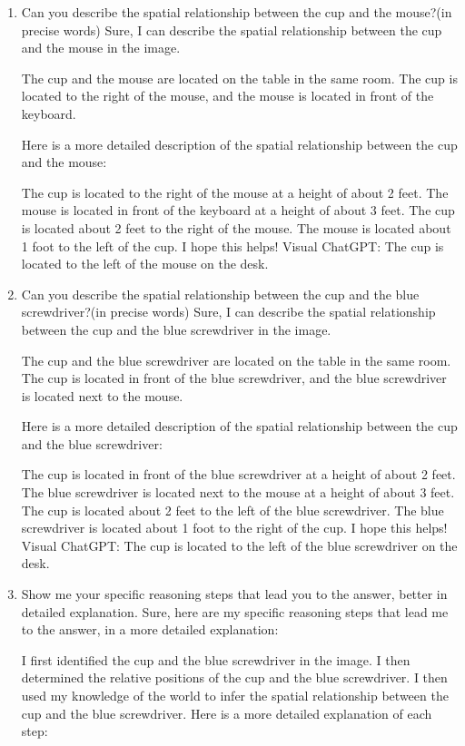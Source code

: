 \begin{enumerate}
    \item Can you describe the spatial relationship between the cup and the mouse?(in precise words)
    \subitem 
    Sure, I can describe the spatial relationship between the cup and the mouse in the image.
    
    The cup and the mouse are located on the table in the same room. The cup is located to the right of the mouse, and the mouse is located in front of the keyboard.
    
    Here is a more detailed description of the spatial relationship between the cup and the mouse:
    
    The cup is located to the right of the mouse at a height of about 2 feet.
    The mouse is located in front of the keyboard at a height of about 3 feet.
    The cup is located about 2 feet to the right of the mouse.
    The mouse is located about 1 foot to the left of the cup.
    I hope this helps!
    \subitem Visual ChatGPT: The cup is located to the left of the mouse on the desk.
    \item Can you describe the spatial relationship between the cup and the blue screwdriver?(in precise words)
    \subitem 
    Sure, I can describe the spatial relationship between the cup and the blue screwdriver in the image.
    
    The cup and the blue screwdriver are located on the table in the same room. The cup is located in front of the blue screwdriver, and the blue screwdriver is located next to the mouse.
    
    Here is a more detailed description of the spatial relationship between the cup and the blue screwdriver:
    
    The cup is located in front of the blue screwdriver at a height of about 2 feet.
    The blue screwdriver is located next to the mouse at a height of about 3 feet.
    The cup is located about 2 feet to the left of the blue screwdriver.
    The blue screwdriver is located about 1 foot to the right of the cup.
    I hope this helps!
    \subitem Visual ChatGPT: The cup is located to the left of the blue screwdriver on the desk.
    \item Show me your specific reasoning steps that lead you to the answer, better in detailed explanation.
    \subitem 
    Sure, here are my specific reasoning steps that lead me to the answer, in a more detailed explanation:
    
    I first identified the cup and the blue screwdriver in the image.
    I then determined the relative positions of the cup and the blue screwdriver.
    I then used my knowledge of the world to infer the spatial relationship between the cup and the blue screwdriver.
    Here is a more detailed explanation of each step:
    

\end{enumerate}
